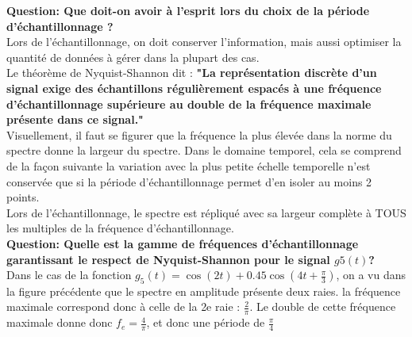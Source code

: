 \documentclass[11pt,a4paper]{article}
\begin{document}
\begin{center}
\end{center}

\textbf{Question: Que doit-on avoir à l'esprit  lors du choix de la période d’échantillonnage ?}\\

Lors de l'échantillonnage, on doit conserver l'information, mais aussi optimiser la quantité de données à gérer dans la plupart des cas.\\

Le théorème de Nyquist-Shannon dit : \textbf{"La représentation discrète d'un signal exige des échantillons régulièrement espacés à une fréquence d'échantillonnage supérieure au double de la fréquence maximale présente dans ce signal."}\\

Visuellement, il faut se figurer que la fréquence la plus élevée dans la norme du spectre donne la largeur du spectre. Dans le domaine temporel, cela se comprend de la façon suivante la variation avec la plus petite échelle temporelle n'est conservée que si la période d'échantillonnage permet d'en isoler au moins 2 points.\\

Lors de l'échantillonnage, le spectre est répliqué avec sa largeur complète à TOUS les multiples de la fréquence d'échantillonnage.\\

\textbf{Question: Quelle est la gamme de fréquences d'échantillonnage garantissant le respect de Nyquist-Shannon pour le signal $g5(t)$?}\\

Dans le cas de la fonction $g_5(t) = \cos(2 t) + 0.45 \cos(4 t + \frac{\pi}{3})$, on a vu dans la figure précédente que le spectre en amplitude présente deux raies. la fréquence maximale correspond donc à celle de la 2e raie : $\frac{2}{\pi}$. Le double de cette fréquence maximale donne donc $f_e = \frac{4}{\pi}$, et donc une période de $\frac{\pi}{4}$\\
\end{document}

